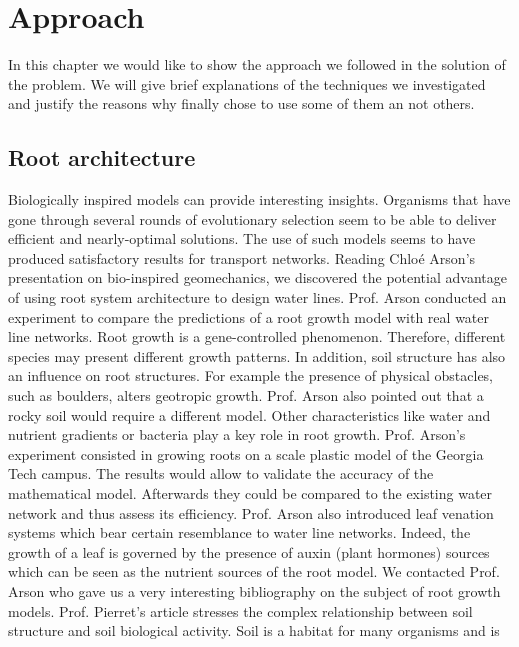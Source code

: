 
\chapter{Approach}
\label{capitolo3}
\thispagestyle{empty}

In this chapter we would like to show the approach we followed in the solution of the problem. 
We will give brief explanations of the techniques we investigated and justify the reasons why finally chose to use some of them an not others.

\section{Root architecture}

\parindent Biologically inspired models can provide interesting insights. Organisms that have gone
through several rounds of evolutionary selection seem to be able to deliver efficient and
nearly-optimal solutions. The use of such models seems to have produced satisfactory
results for transport networks.
\bigbreak
Reading Chloé Arson’s presentation on bio-inspired geomechanics, we discovered the
potential advantage of using root system architecture to design water lines. Prof. Arson
conducted an experiment to compare the predictions of a root growth model with real
water line networks. Root growth is a gene-controlled phenomenon. Therefore, different
species may present different growth patterns. In addition, soil structure has also an influence
on root structures. For example the presence of physical obstacles, such as boulders,
alters geotropic growth. Prof. Arson also pointed out that a rocky soil would require a different model. Other characteristics like water and nutrient gradients or bacteria play
a key role in root growth. Prof. Arson’s experiment consisted in growing roots on a
scale plastic model of the Georgia Tech campus. The results would allow to validate the
accuracy of the mathematical model. Afterwards they could be compared to the existing
water network and thus assess its efficiency. Prof. Arson also introduced leaf venation
systems which bear certain resemblance to water line networks. Indeed, the growth of a
leaf is governed by the presence of auxin (plant hormones) sources which can be seen as
the nutrient sources of the root model.
\bigbreak 
We contacted Prof. Arson who gave us a very interesting bibliography on the subject
of root growth models. Prof. Pierret’s article stresses the complex relationship between
soil structure and soil biological activity. Soil is a habitat for many organisms and is
